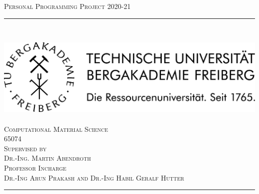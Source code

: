 \begin{titlepage}

    \begin{center}
    \textsc{Personal Programming Project 2020-21 }\\
    \vspace*{0.5 cm}
    {\LARGE \textsc{\mytitle}} %
    \vspace{0.025\textheight}
    \rule{0.75\textwidth}{0.45pt}\\
    \vspace*{1 cm}
    
    \includegraphics[scale=0.6]{WBM_schwarz.png}\\
    \vspace*{2.5 cm}
    {\large \textsc{\myauthor}}\\ %
    \vspace{0.025\textheight}
    {\textsc{Computational Material Science}}\\
	\vspace{0.025\textheight}
	{65074}\\
	\vspace{2 cm}
	\textsc{Supervised by}\\
	\vspace{0.0025\textheight}
	{\textsc{Dr.-Ing. Martin Abendroth}}\\
	\vfill
	\textsc{Professor Incharge}\\
	\vspace{0.0025\textheight}
	{\textsc{Dr.-Ing Arun Prakash and Dr.-Ing Habil Geralf Hutter}}\\
	\vspace{2 cm}
	{\mydate}
    \vspace{0.25\textheight}     	
	\rule{\textwidth}{1.5pt} 
    \end{center} 
         
\end{titlepage}